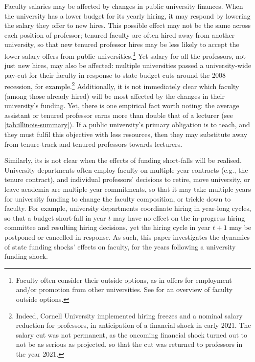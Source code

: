 Faculty salaries may be affected by changes in public university finances.
When the university has a lower budget for its yearly hiring, it may respond by lowering the salary they offer to new hires.
This possible effect may not be the same across each position of professor; tenured faculty are often hired away from another university, so that new tenured professor hires may be less likely to accept the lower salary offers from public universities.\footnote{
    Faculty often consider their outside options, as in offers for employment and/or promotion from other universities.
    See \cite{blackaby2005} for an overview of faculty outside options.
}
Yet salary for all the professors, not just new hires, may also be affected: multiple universities passed a university-wide pay-cut for their faculty in response to state budget cuts around the 2008 recession, for example.\footnote{
    Indeed, Cornell University implemented hiring freezes and a nominal salary reduction for professors, in anticipation of a financial shock in early 2021.
    The salary cut was not permanent, as the oncoming financial shock turned out to not be as serious as projected, so that the cut was returned to professors in the year 2021.
}
Additionally, it is not immediately clear which faculty (among those already hired) will be most affected by the changes in their university's funding.
Yet, there is one empirical fact worth noting: the average assistant or tenured professor earns more than double that of a lecturer (see \autoref{tab:illinois-summary}).
If a public university's primary obligation is to teach, and they must fulfil this objective with less resources, then they may substitute away from tenure-track and tenured professors towards lecturers.

Similarly, its is not clear when the effects of funding short-falls will be realised.
University departments often employ faculty on multiple-year contracts (e.g., the tenure contract), and individual professors' decisions to retire, move university, or leave academia are multiple-year commitments, so that it may take multiple years for university funding to change the faculty composition, or trickle down to faculty.
For example, university departments coordinate hiring in year-long cycles, so that a budget short-fall in year $t$ may have no effect on the in-progress hiring committee and resulting hiring decisions, yet the hiring cycle in year $t+1$ may be postponed or cancelled in response.
As such, this paper investigates the dynamics of state funding shocks' effects on faculty, for the years following a university funding shock.
